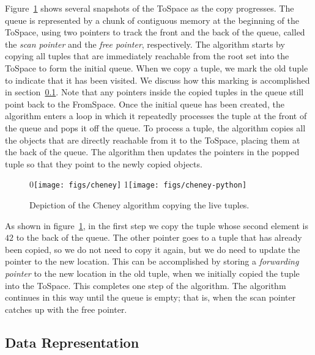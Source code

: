 \documentclass[7x10]{TimesAPriori_MIT}%
\def\racketEd{0}
\def\pythonEd{1}
\def\edition{1}
\newcommand{\racket}[1]{{\if\edition\racketEd{#1}\fi}}
\newcommand{\pythonColor}[0]{}
\newcommand{\python}[1]{{\if\edition\pythonEd\pythonColor #1\fi}}
\numberwithin{theorem}{chapter}
\numberwithin{definition}{chapter}
\numberwithin{equation}{chapter}
\begin{document}
Figure~\ref{fig:cheney} shows several snapshots of the ToSpace as the
copy progresses. The queue is represented by a chunk of contiguous
memory at the beginning of the ToSpace, using two pointers to track
the front and the back of the queue, called the \emph{scan pointer}
and the \emph{free pointer}, respectively. The algorithm starts by
copying all tuples that are immediately reachable from the root set
into the ToSpace to form the initial queue.  When we copy a tuple, we
mark the old tuple to indicate that it has been visited. We discuss
how this marking is accomplished in section~\ref{sec:data-rep-gc}. Note
that any pointers inside the copied tuples in the queue still point
back to the FromSpace. Once the initial queue has been created, the
algorithm enters a loop in which it repeatedly processes the tuple at
the front of the queue and pops it off the queue.  To process a tuple,
the algorithm copies all the objects that are directly reachable from it
to the ToSpace, placing them at the back of the queue. The algorithm
then updates the pointers in the popped tuple so that they point to the
newly copied objects.

\begin{figure}[tbp]
\centering
\begin{tcolorbox}[colback=white]
\racket{\texttt{[image: figs/cheney]}}
\python{\texttt{[image: figs/cheney-python]}}
\end{tcolorbox}

\caption{Depiction of the Cheney algorithm copying the live tuples.}
\label{fig:cheney}
\end{figure}

As shown in figure~\ref{fig:cheney}, in the first step we copy the
tuple whose second element is $42$ to the back of the queue. The other
pointer goes to a tuple that has already been copied, so we do not
need to copy it again, but we do need to update the pointer to the new
location. This can be accomplished by storing a \emph{forwarding
pointer} to the new location in the
old tuple, when we initially copied the tuple into the
ToSpace. This completes one step of the algorithm. The algorithm
continues in this way until the queue is empty; that is, when the scan
pointer catches up with the free pointer.


\subsection{Data Representation}
\label{sec:data-rep-gc}
\end{document}
